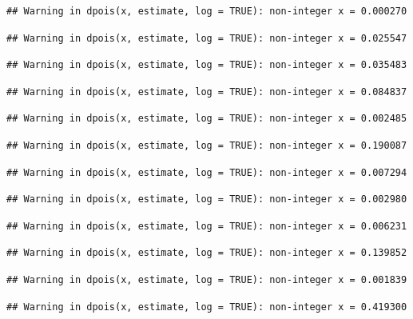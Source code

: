 \documentclass[]{article}
\begin{document}
\begin{verbatim}
## Warning in dpois(x, estimate, log = TRUE): non-integer x = 0.000270
\end{verbatim}

\begin{verbatim}
## Warning in dpois(x, estimate, log = TRUE): non-integer x = 0.025547
\end{verbatim}

\begin{verbatim}
## Warning in dpois(x, estimate, log = TRUE): non-integer x = 0.035483
\end{verbatim}

\begin{verbatim}
## Warning in dpois(x, estimate, log = TRUE): non-integer x = 0.084837
\end{verbatim}

\begin{verbatim}
## Warning in dpois(x, estimate, log = TRUE): non-integer x = 0.002485
\end{verbatim}

\begin{verbatim}
## Warning in dpois(x, estimate, log = TRUE): non-integer x = 0.190087
\end{verbatim}

\begin{verbatim}
## Warning in dpois(x, estimate, log = TRUE): non-integer x = 0.007294
\end{verbatim}

\begin{verbatim}
## Warning in dpois(x, estimate, log = TRUE): non-integer x = 0.002980
\end{verbatim}

\begin{verbatim}
## Warning in dpois(x, estimate, log = TRUE): non-integer x = 0.006231
\end{verbatim}

\begin{verbatim}
## Warning in dpois(x, estimate, log = TRUE): non-integer x = 0.139852
\end{verbatim}

\begin{verbatim}
## Warning in dpois(x, estimate, log = TRUE): non-integer x = 0.001839
\end{verbatim}

\begin{verbatim}
## Warning in dpois(x, estimate, log = TRUE): non-integer x = 0.419300
\end{verbatim}
\end{document}
